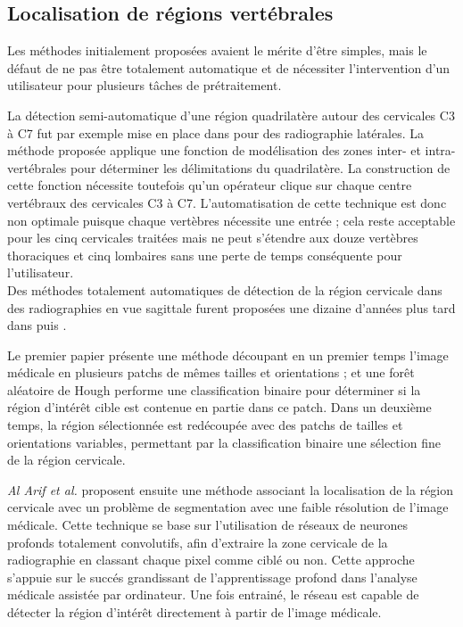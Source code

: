     \subsection{Localisation de régions vertébrales}

        Les méthodes initialement proposées avaient le mérite d'être simples, mais le défaut de ne pas être totalement automatique et de nécessiter l'intervention d'un utilisateur pour plusieurs tâches de prétraitement.

        La détection semi-automatique d'une région quadrilatère autour des cervicales C3 à C7 fut par exemple mise en place dans \cite{Benjelloun2006a} pour des radiographie latérales. La méthode proposée applique une fonction de modélisation des zones inter- et intra-vertébrales pour déterminer les délimitations du quadrilatère. La construction de cette fonction nécessite toutefois qu'un opérateur clique sur chaque centre vertébraux des cervicales C3 à C7. L'automatisation de cette technique est donc non optimale puisque chaque vertèbres nécessite une entrée ; cela reste acceptable pour les cinq cervicales traitées mais ne peut s'étendre aux douze vertèbres thoraciques et cinq lombaires sans une perte de temps conséquente pour l'utilisateur.
        \\

        Des méthodes totalement automatiques de détection de la région cervicale dans des radiographies en vue sagittale furent proposées une dizaine d'années plus tard dans \cite{AlArif2016a} puis \cite{AlArif2017a}.

        Le premier papier présente une méthode découpant en un premier temps l'image médicale en plusieurs patchs de mêmes tailles et orientations ; et une forêt aléatoire de Hough performe une classification binaire pour déterminer si la région d'intérêt cible est contenue en partie dans ce patch. Dans un deuxième temps, la région sélectionnée est redécoupée avec des patchs de tailles et orientations variables, permettant par la classification binaire une sélection fine de la région cervicale.

        {\itshape Al Arif et al.} proposent ensuite une méthode associant la localisation de la région cervicale avec un problème de segmentation avec une faible résolution de l'image médicale. Cette technique se base sur l'utilisation de réseaux de neurones profonds totalement convolutifs, afin d'extraire la zone cervicale de la radiographie en classant chaque pixel comme ciblé ou non. Cette approche s'appuie sur le succés grandissant de l'apprentissage profond dans l'analyse médicale assistée par ordinateur. Une fois entrainé, le réseau est capable de détecter la région d'intérêt directement à partir de l'image médicale.

